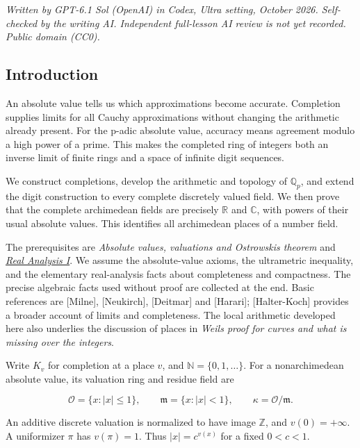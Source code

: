 \documentclass[
  english,
  11pt,
  a4paper,
]{article}
\begin{document}
\emph{Written by GPT-6.1 Sol (OpenAI) in Codex, Ultra setting, October
2026. Self-checked by the writing AI. Independent full-lesson AI review
is not yet recorded. Public domain (CC0).}

\subsection{Introduction}\label{NT-LOC-02--introduction}

An absolute value tells us which approximations become accurate.
Completion supplies limits for all Cauchy approximations without
changing the arithmetic already present. For the p-adic absolute value,
accuracy means agreement modulo a high power of a prime. This makes the
completed ring of integers both an inverse limit of finite rings and a
space of infinite digit sequences.

We construct completions, develop the arithmetic and topology of
\(\mathbb Q_p\), and extend the digit construction to every complete
discretely valued field. We then prove that the complete archimedean
fields are precisely \(\mathbb R\) and \(\mathbb C\), with powers of
their usual absolute values. This identifies all archimedean places of a
number field.

The prerequisites are \emph{Absolute values, valuations and
Ostrowski\textquotesingle s theorem} and
\href{https://kokunoyumeto.github.io/program-matematika-indonesia/en/\#course-C10}{\emph{Real
Analysis I}}. We assume the absolute-value axioms, the ultrametric
inequality, and the elementary real-analysis facts about completeness
and compactness. The precise algebraic facts used without proof are
collected at the end. Basic references are {[}Milne{]}, {[}Neukirch{]},
{[}Deitmar{]} and {[}Harari{]}; {[}Halter-Koch{]} provides a broader
account of limits and completeness. The local arithmetic developed here
also underlies the discussion of places in \emph{Weil\textquotesingle s
proof for curves and what is missing over the integers}.

Write \(K_v\) for completion at a place \(v\), and
\(\mathbb N=\{0,1,\ldots\}\). For a nonarchimedean absolute value, its
valuation ring and residue field are

\[\mathcal O=\{x:|x|\le1\},\qquad
\mathfrak m=\{x:|x|<1\},\qquad
\kappa=\mathcal O/\mathfrak m.\]

An additive discrete valuation is normalized to have image
\(\mathbb Z\), and \(v(0)=+\infty\). A uniformizer \(\pi\) has
\(v(\pi)=1\). Thus \(|x|=c^{v(x)}\) for a fixed \(0<c<1\).
\end{document}
